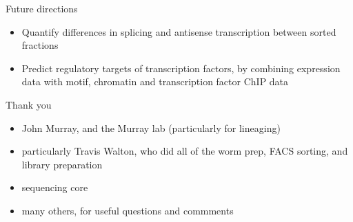 \documentclass[serif,9pt]{beamer}
\begin{document}
\begin{frame}{Future directions}

\begin{itemize}

\item Quantify differences in splicing and antisense transcription between
sorted fractions
\pause

\item Predict regulatory targets of transcription factors, by combining
expression data with motif, chromatin and transcription factor ChIP data
\pause

\end{itemize}

\end{frame}

\begin{frame}{Thank you}

\begin{itemize}

\item John Murray, and the Murray lab (particularly for lineaging)

\item particularly Travis Walton, who did all of the worm prep, FACS sorting,
and library preparation

\item sequencing core

\item many others, for useful questions and commments

\end{itemize}

\end{frame}
\end{document}
